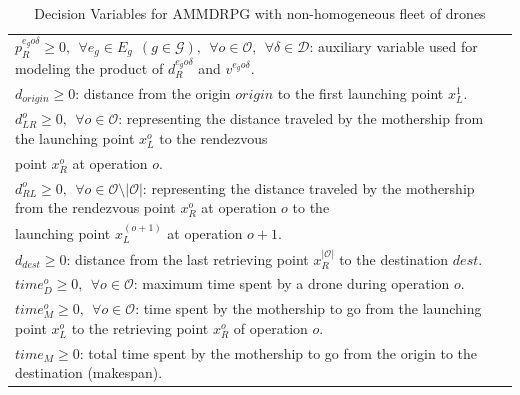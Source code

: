 \documentclass[10pt,a4paper]{elsarticle}
\begin{document}
\begin{table}[h!]
\begin{tabular}{|l|}
		$p_R^{e_go\delta} \geq 0, \:\: \forall e_g \in E_g\:\: (g \in \mathcal{G}), \:\:\forall o \in \mathcal O, \:\:\forall \delta\in\mathcal D$: auxiliary variable used for modeling the product of $d_R^{e_go\delta}$ and $v^{e_go\delta}$.\\
		$d_{origin}\geq 0$: distance from the origin $origin$ to the first launching point $x_L^1$.\\
		$d_{LR}^o \geq 0, \:\: \forall o \in \mathcal O$: representing the distance traveled by the mothership from the launching point $x_L^o$ to the rendezvous\\
		\hspace*{1cm}   point $x_R^o$ at operation $o$.\\
		$d_{RL}^o \geq 0, \:\: \forall o \in \mathcal O\setminus|\mathcal O|$: representing the distance traveled by the mothership from the rendezvous point $x_R^o$ at operation $o$ to the \\ 
		\hspace*{1cm}  launching point $x_L^{(o+1)}$ at operation $o+1$.\\
		$d_{dest}\geq 0$: distance from the last retrieving point $x_R^{|\mathcal O|}$ to the destination $dest$.\\
		$time_D^o \geq 0, \:\: \forall o \in \mathcal O$: maximum time spent by a drone during operation $o$.\\
		$time_M^o \geq 0, \:\: \forall o \in \mathcal O$: time spent by the mothership to go from the launching point $x_L^o$ to the retrieving point $x_R^o$ of operation $o$.\\
		$time_M \geq 0$: total time spent by the mothership to go from the origin to the destination (makespan).\\
		\hline
	\end{tabular}
	\caption{Decision Variables for AMMDRPG with non-homogeneous fleet of drones}
	\label{table:At2}
\end{table}
\end{document}
